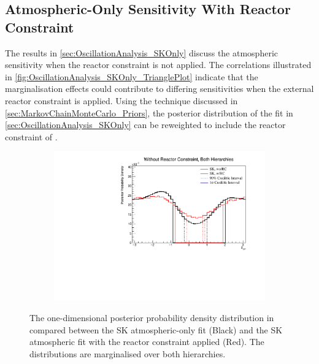 \clearpage
\subsection{Atmospheric-Only Sensitivity With Reactor Constraint}
\label{sec:OscillationAnalysis_SKOnly_wRC}

The results in \autoref{sec:OscillationAnalysis_SKOnly} discuss the atmospheric sensitivity when the reactor constraint is not applied. The correlations illustrated in \autoref{fig:OscillationAnalysis_SKOnly_TrianglePlot} indicate that the marginalisation effects could contribute to differing sensitivities when the external reactor constraint is applied. Using the technique discussed in \autoref{sec:MarkovChainMonteCarlo_Priors}, the posterior distribution of the fit in \autoref{sec:OscillationAnalysis_SKOnly} can be reweighted to include the reactor constraint of  \cite{Particle_Data_Group2020-ms}.

\iffalse
\begin{figure}[h]
  \begin{subfigure}[t]{0.98\textwidth}
    \includegraphics[width=\textwidth, trim={0mm 0mm 0mm 0mm}, clip,page=1]{Figures/OA/SKOnlyFit_wRC/ContourComparison_1D_dcp_BH_2_wRC_woRC_UnSmeared_CredibleInterval.pdf}
  \end{subfigure}
  \caption{The one-dimensional posterior probability density distribution in  compared between the SK atmospheric-only fit (Black) and the SK atmospheric fit with the reactor constraint applied (Red). The distributions are marginalised over both hierarchies.}
  \label{fig:OscillationAnalysis_SKOnly_DCP_WRC}
\end{figure}

